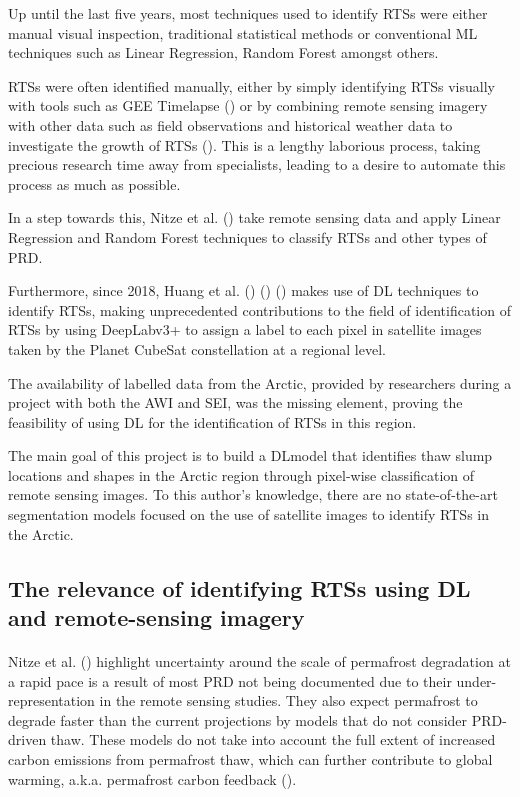 Up until the last five years, most techniques used to identify \gls{RTS}s were either manual visual inspection, traditional statistical methods or conventional \gls{ML} techniques such as Linear Regression, Random Forest amongst others.

\gls{RTS}s were often identified manually, either by simply identifying \gls{RTS}s visually with tools such as \gls{GEE} Timelapse (\cite{lewkowicz_extremes_2019}) or by combining remote sensing imagery with other data such as field observations and historical weather data to investigate the growth of \gls{RTS}s (\cite{KOKELJ201556}). This is a lengthy laborious process, taking precious research time away from specialists, leading to a desire to automate this process as much as possible.

In a step towards this, Nitze et al. (\cite{articleing2018}) take remote sensing data and apply Linear Regression and Random Forest techniques to classify \gls{RTS}s and other types of \gls{PRD}.

Furthermore, since 2018, Huang et al. (\cite{HUANG10122067}) (\cite{HUANG2020111534}) (\cite{HUANG2021102399}) makes use of \gls{DL} techniques to identify \gls{RTS}s, making unprecedented contributions to the field of identification of \gls{RTS}s by using DeepLabv3+ to assign a label to each pixel in satellite images taken by the Planet CubeSat constellation at a regional level.

The availability of labelled data from the Arctic, provided by researchers during a project with both the \gls{AWI} and \gls{SEI}, was the missing element, proving the feasibility of using DL for the identification of \gls{RTS}s in this region.

The main goal of this project is to build a \gls{DL}model that identifies thaw slump locations and shapes in the Arctic region through pixel-wise classification of remote sensing images. 
To this author's knowledge, there are no state-of-the-art segmentation models focused on the use of satellite images to identify \gls{RTS}s in the Arctic.

\subsection{The relevance of identifying \gls{RTS}s using \gls{DL} and remote-sensing imagery} \label{rts_ref}
\paragraph{}
Nitze et al. (\cite{articleing2018}) highlight uncertainty around the scale of permafrost degradation at a rapid pace is a result of most \gls{PRD} not being documented due to their under-representation in the remote sensing studies. 
They also expect permafrost to degrade faster than the current projections by models that do not consider \gls{PRD}-driven thaw. These models do not take into account the full extent of increased carbon emissions from permafrost thaw, which can further contribute to global warming, \gls{a.k.a.} permafrost carbon feedback (\cite{articlecarbonfeedback}).

